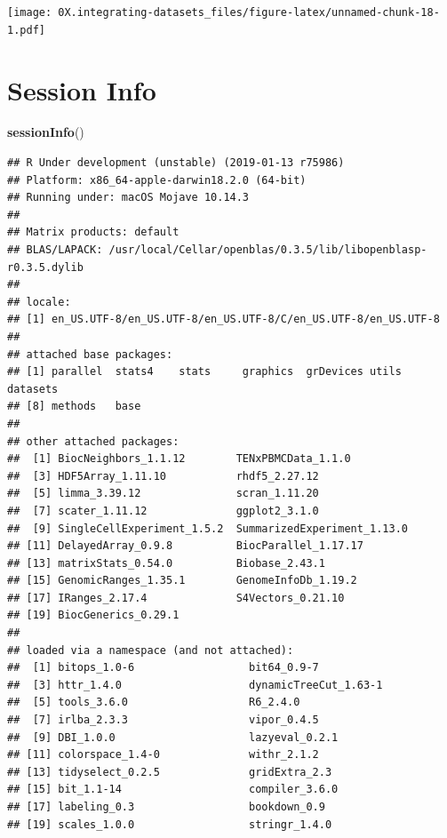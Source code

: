 \documentclass[]{book}
\newenvironment{Shaded}{\begin{snugshade}}{\end{snugshade}}
\newcommand{\KeywordTok}[1]{\textcolor[rgb]{0.13,0.29,0.53}{\textbf{#1}}}
\newcommand{\NormalTok}[1]{#1}
\begin{document}
\texttt{[image: 0X.integrating-datasets\_files/figure-latex/unnamed-chunk-18-1.pdf]}

\hypertarget{session-info}{%
\section{Session Info}\label{session-info}}

\begin{Shaded}
\begin{Highlighting}[]
\KeywordTok{sessionInfo}\NormalTok{()}
\end{Highlighting}
\end{Shaded}

\begin{verbatim}
## R Under development (unstable) (2019-01-13 r75986)
## Platform: x86_64-apple-darwin18.2.0 (64-bit)
## Running under: macOS Mojave 10.14.3
## 
## Matrix products: default
## BLAS/LAPACK: /usr/local/Cellar/openblas/0.3.5/lib/libopenblasp-r0.3.5.dylib
## 
## locale:
## [1] en_US.UTF-8/en_US.UTF-8/en_US.UTF-8/C/en_US.UTF-8/en_US.UTF-8
## 
## attached base packages:
## [1] parallel  stats4    stats     graphics  grDevices utils     datasets 
## [8] methods   base     
## 
## other attached packages:
##  [1] BiocNeighbors_1.1.12        TENxPBMCData_1.1.0         
##  [3] HDF5Array_1.11.10           rhdf5_2.27.12              
##  [5] limma_3.39.12               scran_1.11.20              
##  [7] scater_1.11.12              ggplot2_3.1.0              
##  [9] SingleCellExperiment_1.5.2  SummarizedExperiment_1.13.0
## [11] DelayedArray_0.9.8          BiocParallel_1.17.17       
## [13] matrixStats_0.54.0          Biobase_2.43.1             
## [15] GenomicRanges_1.35.1        GenomeInfoDb_1.19.2        
## [17] IRanges_2.17.4              S4Vectors_0.21.10          
## [19] BiocGenerics_0.29.1        
## 
## loaded via a namespace (and not attached):
##  [1] bitops_1.0-6                  bit64_0.9-7                  
##  [3] httr_1.4.0                    dynamicTreeCut_1.63-1        
##  [5] tools_3.6.0                   R6_2.4.0                     
##  [7] irlba_2.3.3                   vipor_0.4.5                  
##  [9] DBI_1.0.0                     lazyeval_0.2.1               
## [11] colorspace_1.4-0              withr_2.1.2                  
## [13] tidyselect_0.2.5              gridExtra_2.3                
## [15] bit_1.1-14                    compiler_3.6.0               
## [17] labeling_0.3                  bookdown_0.9                 
## [19] scales_1.0.0                  stringr_1.4.0                

\end{verbatim}
\end{document}
